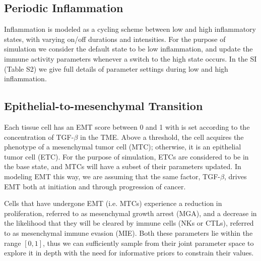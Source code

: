 \documentclass[11pt]{article}
\begin{document}
\subsection{Periodic Inflammation} 
Inflammation is modeled as a cycling scheme between low and high inflammatory states, with varying on/off durations and intensities.
For the purpose of simulation we consider the default state to be low inflammation, and update the immune activity parameters whenever a switch to the high state occurs.
In the SI (Table S2) we give full details of parameter settings during low and high inflammation.

\subsection{Epithelial-to-mesenchymal Transition}\label{EMT}
Each tissue cell has an EMT score between 0 and 1 with is set according to the concentration of TGF-$\beta$ in the TME. Above a threshold, the cell acquires the phenotype of a mesenchymal tumor cell (MTC); otherwise, it is an epithelial tumor cell (ETC).
For the purpose of simulation, ETCs are considered to be in the base state, and MTCs will have a subset of their parameters updated.
In modeling EMT this way, we are assuming that the same factor, TGF-$\beta$, drives EMT both at initiation and through progression of cancer.

\par
Cells that have undergone EMT (i.e. MTCs) experience a reduction in proliferation, referred to as mesenchymal growth arrest (MGA), and a decrease in the likelihood that they will be cleared by immune cells (NKs or CTLs), referred to as mesenchymal immune evasion (MIE). Both these parameters lie within the range $[0,1]$, thus we can sufficiently sample from their joint parameter space to explore it in depth with the need for informative priors to constrain their values.
\end{document}
